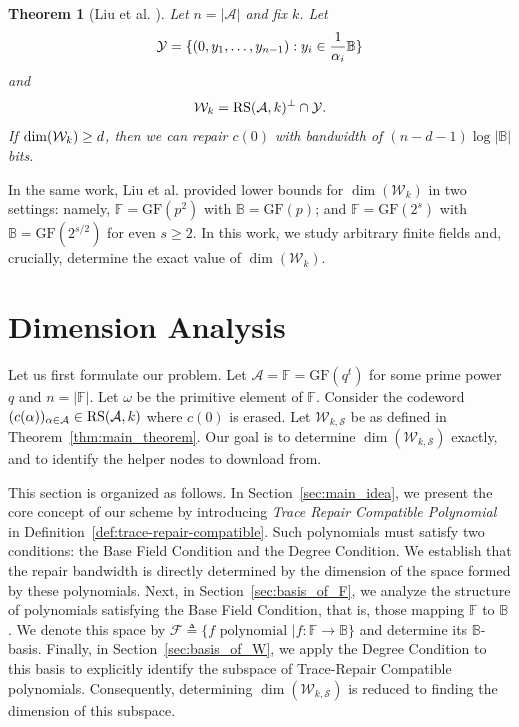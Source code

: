 \documentclass[onecolumn]{IEEEtran}
\theoremstyle{plain}
\newtheorem{theorem}{Theorem}
\theoremstyle{definition}
\newcommand{\FF}{\mathbb{F}}
\newcommand{\BB}{\mathbb{B}}
\newcommand{\GF}{{\mathrm{GF}}}
\newcommand{\cS}{\mathcal{S}}
\newcommand{\cA}{\mathcal{A}}
\newcommand{\cF}{\mathcal{F}}
\newcommand{\cW}{\mathcal{W}}
\newcommand{\cY}{\mathcal{Y}}
\newcommand{\rs}{{\rm RS}}
\newcommand{\kim}[1]{{\color{blue} Kim:#1}}
\begin{document}

\begin{theorem}[Liu et al. \cite{Liu2024}]\label{thm:liu}
    Let $n= |\cA|$ and fix $k$. Let
    $$
        {\cal Y} = \{(0,y_1,\ldots,y_{n-1}): y_i \in\frac{1}{\alpha_i}\BB\}
    $$
    and
    $$
    {\cal W}_k = \rs(\cA,k)^\perp\cap\cY.
    $$
    If $\dim({\cal W}_k) \ge d$, then we can repair $c(0)$ with bandwidth of $(n-d-1)\log|\BB|$ bits.
\end{theorem}

In the same work, Liu et al. provided lower bounds for $\dim(\cW_k)$ in two settings: namely, $\FF=\GF(p^2)$ with $\BB=\GF(p)$; and $\FF=\GF(2^s)$ with $\BB=\GF(2^{s/2})$ for even $s\ge 2$. In this work, we study arbitrary finite fields and, crucially, determine the exact value of $\dim(\cW_k)$.

\section{Dimension Analysis}\label{sec:our_work}

Let us first formulate our problem. 
Let $\cA=\FF = \GF(q^t)$ for some prime power $q$ and $n=|\FF|$. 
Let $\omega$ be the primitive element of $\FF$.
Consider the codeword $(c(\alpha))_{\alpha\in\cA}\in\rs(\cA,k)$ where $c(0)$ is erased. 
Let $\cW_{k,\cS}$ be as defined in Theorem~\ref{thm:main_theorem}. 
Our goal is to determine $\dim(\cW_{k,\cS})$ exactly, and to identify the helper nodes to download from.

This section is organized as follows. In Section~\ref{sec:main_idea}, we present the core concept of our scheme by introducing \textit{Trace Repair Compatible Polynomial} in Definition~\ref{def:trace-repair-compatible}. Such polynomials must satisfy two conditions: the Base Field Condition and the Degree Condition. We establish that the repair bandwidth is directly determined by the dimension of the space formed by these polynomials. Next, in Section~\ref{sec:basis_of_F}, we analyze the structure of polynomials satisfying the Base Field Condition, that is, those mapping $\FF$ to $\BB$. We denote this space by $\cF\triangleq \{f\text{ polynomial } | f:\FF\to \BB\}$ and determine its $\BB$-basis. Finally, in Section~\ref{sec:basis_of_W}, we apply the Degree Condition to this basis to explicitly identify the subspace of Trace-Repair Compatible polynomials. Consequently, determining $\dim(\cW_{k,\cS})$ is reduced to finding the dimension of this subspace.
\end{document}
